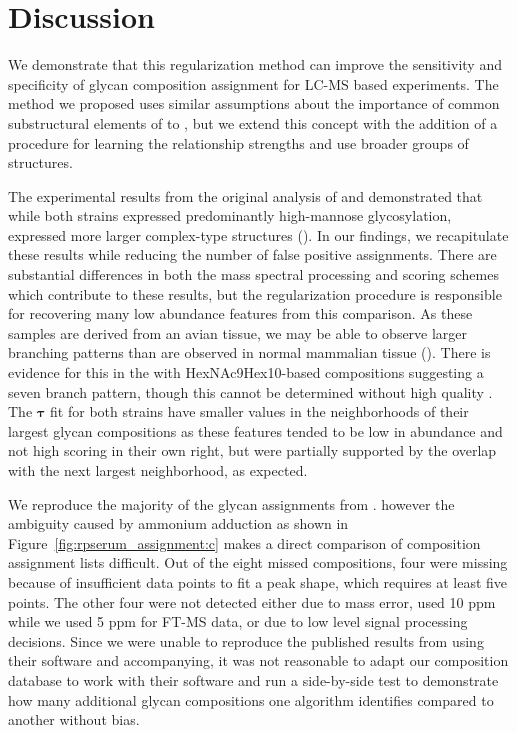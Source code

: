 \section{Discussion}

    We demonstrate that this regularization method can improve the
    sensitivity and specificity of glycan composition assignment for
    LC-MS based experiments. The method we proposed uses similar
    assumptions about the importance of common substructural elements
    of \nglycans to \cite{Goldberg2009}, but we extend this concept
    with the addition of a procedure for learning the relationship
    strengths and use broader groups of structures.

    The experimental results from the original analysis of \philbs and
     demonstrated that while both strains expressed predominantly
    high-mannose glycosylation, \philbs expressed more larger complex-type
    structures (\cite{Khatri2016a}). In our findings, we recapitulate
    these results while reducing the number of false positive assignments.
    There are substantial differences in both the mass spectral processing
    and scoring schemes which contribute to these results, but the regularization
    procedure is responsible for recovering many low abundance features from
    this comparison. As these samples are derived from an avian tissue, we
    may be able to observe larger branching patterns than are observed in
    normal mammalian tissue (\cite{Stanley2009}). There is evidence for this
    in the \philbs with HexNAc9Hex10-based compositions suggesting a seven
    branch pattern, though this cannot be determined without high quality
    \msn. The $\mathbf{\tau}$ fit for both strains have smaller values
    in the neighborhoods of their largest glycan compositions as these
    features tended to be low in abundance and not high scoring in their
    own right, but were partially supported by the overlap with the next
    largest neighborhood, as expected.

    We reproduce the majority of the glycan assignments from \cite{Yu2013}.
    however the ambiguity caused by ammonium adduction as shown in
    Figure~\ref{fig:rpserum_assignment:c} makes a direct comparison of
    composition assignment lists difficult. Out of the eight missed compositions,
    four were missing because of insufficient data points to fit a peak shape,
    which requires at least five points. The other four were not detected either
    due to mass error, \cite{Yu2013} used 10 ppm while we used 5 ppm for FT-MS data,
    or due to low level signal processing decisions. Since we were unable to
    reproduce the published results from \cite{Yu2013} using their software and
    accompanying, it was not reasonable to adapt our composition database to work
    with their software and run a side-by-side test to demonstrate how many
    additional glycan compositions one algorithm identifies compared to another
    without bias.

